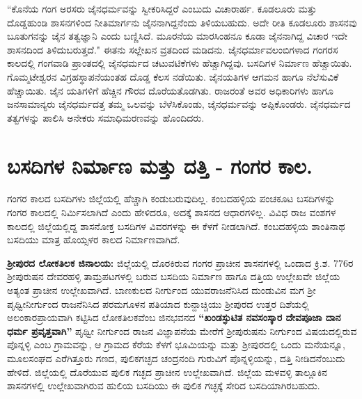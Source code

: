 “ಕೊನೆಯ ಗಂಗ ಅರಸರು ಜೈನಧರ್ಮವನ್ನು ಸ್ವೀಕರಿಸಿದ್ದರೆ ಎಂಬುದು ವಿಚಾರಾರ್ಹ. ಕೂಡಲೂರು ಮತ್ತು ದೊಡ್ಡಹುಂಡಿ ಶಾಸನಗಳಿಂದ ನೀತಿಮಾರ್ಗನು ಜೈನನಾಗಿದ್ದನೆಂದು ತಿಳಿಯಬಹುದು. ಅದೇ ರೀತಿ ಕೂಡಲೂರು ಶಾಸನವು ಬೂತುಗನನ್ನು ಜೈನ ತತ್ವಜ್ಞಾನಿ ಎಂದು ಬಣ್ಣಿಸಿದೆ. ಮೂರನೆಯ ಮಾರಸಿಂಹನೂ ಕೂಡಾ ಜೈನನಾಗಿದ್ದ ವಿಚಾರ ಇದೇ ಶಾಸನದಿಂದ ತಿಳಿದುಬರುತ್ತದೆ." ಈತನು ಸಲ್ಲೇಖನ ವ್ರತದಿಂದ ಮಡಿದನು. ಜೈನಧರ್ಮಾವಲಂಬಿಗಳಾದ ಗಂಗರಸ ಕಾಲದಲ್ಲಿ ಗಂಗವಾಡಿ ಪ್ರಾಂತದಲ್ಲಿ ಜೈನಧರ್ಮದ ಚಟುವಟಿಕೆಗಳು ಹೆಚ್ಚಾಗಿದ್ದವು. ಬಸದಿಗಳ ನಿರ್ಮಾಣ ಹೆಚ್ಚಾಯಿತು. ಗೊಮ್ಮಟೇಶ್ವರನ ವಿಗ್ರಹಸ್ಥಾಪನೆಯಂತಹ ದೊಡ್ಡ ಕೆಲಸ ನಡೆಯಿತು. ಜೈನಯತಿಗಳ ಆಗಮನ ಹಾಗೂ ನೆಲೆಸುವಿಕೆ ಹೆಚ್ಚಾಯಿತು. ಜೈನ ಯತಿಗಳಿಗೆ ಹೆಚ್ಚಿನ ಗೌರವ ದೊರೆಯತೊಡಗಿತು. ರಾಜರಂತೆ ಅವರ ಅಧಿಕಾರಿಗಳು ಹಾಗೂ ಜನಸಾಮಾನ್ಯರು ಜೈನಧರ್ಮದತ್ತ ತಮ್ಮ ಒಲವನ್ನು ಬೆಳೆಸಿಕೊಂಡು, ಜೈನಧರ್ಮವನ್ನು ಅಪ್ಪಿಕೊಂಡರು. ಜೈನಧರ್ಮದ ತತ್ವಗಳನ್ನು ಪಾಲಿಸಿ ಅನೇಕರು ಸಮಾಧಿಮರಣವನ್ನು ಹೊಂದಿದರು.


\section*{ಬಸದಿಗಳ ನಿರ್ಮಾಣ ಮತ್ತು ದತ್ತಿ - ಗಂಗರ ಕಾಲ.}

ಗಂಗರ ಕಾಲದ ಬಸದಿಗಳು ಜಿಲ್ಲೆಯಲ್ಲಿ ಹೆಚ್ಚಾಗಿ ಕಂಡುಬರುವುದಿಲ್ಲ. ಕಂಬದಹಳ್ಳಿಯ ಪಂಚಕೂಟ ಬಸದಿಗಳನ್ನು ಗಂಗರ ಕಾಲದಲ್ಲಿ ನಿರ್ಮಿಸಲಾಗಿದೆ ಎಂದು ಹೇಳಿದರೂ, ಅದಕ್ಕೆ ಶಾಸನದ ಆಧಾರಗಳಿಲ್ಲ. ವಿವಿಧ ರಾಜ ವಂಶಗಳ ಕಾಲದಲ್ಲಿ ಜಿಲ್ಲೆಯಲ್ಲಿದ್ದ ಶಾಸನೋಕ್ತ ಬಸದಿಗಳ ವಿವರಗಳನ್ನು ಈ ಕೆಳಗೆ ನೀಡಲಾಗಿದೆ. ಕಂಬದಹಳ್ಳಿಯ ಶಾಂತಿನಾಥ ಬಸದಿಯು ಮಾತ್ರ ಹೊಯ್ಸಳರ ಕಾಲದ ನಿರ್ಮಾಣವಾಗಿದೆ.

\textbf{ಶ‍್ರೀಪುರದ ಲೋಕತಿಲಕ ಜಿನಾಲಯ:} ಜಿಲ್ಲೆಯಲ್ಲಿ ದೊರಕಿರುವ ಗಂಗರ ಪ್ರಾಚೀನ ಶಾಸನಗಳಲ್ಲಿ ಒಂದಾದ ಕ್ರಿ.ಶ. 776ರ ಶ‍್ರೀಪುರುಷನ ದೇವರಹಳ್ಳಿ ತಾಮ್ರಪಟಗಳಲ್ಲಿ ಬರುವ ಬಸದಿಯ ನಿರ್ಮಾಣ ಹಾಗೂ ದತ್ತಿಯ ಉಲ್ಲೇಖವೇ ಜಿಲ್ಲೆಯ ಅತ್ಯಂತ ಪ್ರಾಚೀನ ಉಲ್ಲೇಖವಾಗಿದೆ. ಬಾಣಕುಲದ ನೀರ್ಗುಂದ ಯುವರಾಜನೆನಿಸಿದ ದುಂಡುವಿನ ಮಗ ಶ‍್ರೀ ಪೃಥ್ವೀನೀರ್ಗುಂದ ರಾಜನೆನಿಸಿದ ಪರಮಗೂಳನ ಪತಿಯಾದ ಕುನ್ದಾಚ್ಚಿಯು ಶ‍್ರೀಪುರದ ಉತ್ತರ ದಿಶೆಯಲ್ಲಿ ಅಲಂಕಾರಪ್ರಾಯವಾಗಿ ಕಟ್ಟಿಸಿದ ಲೋಕತಿಲಕವೆಂಬ ಜಿನಭವನದ \textbf{“ಖಂಡಸ್ಫುಟಿತ ನವಸಂಸ್ಕಾರ ದೇವಪೂಜಾ ದಾನ ಧರ್ಮ ಪ್ರವೃತ್ತವಾಗಿ”} ಪೃಥ್ವೀ ನೀರ್ಗುಂದ ರಾಜನ ವಿಜ್ಞಾಪನೆಯ ಮೇರೆಗೆ ಶ‍್ರೀಪುರುಷನು ನೀರ್ಗುಂದ ವಿಷಯದಲ್ಲಿರುವ ಪೊನ್ನಳ್ಳಿ ಎಂಬ ಗ್ರಾಮವನ್ನು, ಆ ಗ್ರಾಮದ ಕೆರೆಯ ಕೆಳಗೆ ಭೂಮಿಯನ್ನು ಮತ್ತು ಶ‍್ರೀಪುರದಲ್ಲಿ ಒಂದು ಮನೆಯನ್ನೂ, ಮೂಲಸಂಘದ ಎರೆಗಿತ್ತೂರು ಗಣದ, ಪುಲಿಕಗಚ್ಛದ ಚಂದ್ರನಂದಿ ಗುರುವಿಗೆ ಪೊನ್ನಳ್ಳಿಯನ್ನು, ದತ್ತಿ ನೀಡಿದನೆಂಬುದು ಹೇಳಿದೆ. ಜಿಲ್ಲೆಯಲ್ಲಿ ದೊರೆಯುವ ಪುಲಿಕ ಗಚ್ಛದ ಪ್ರಾಚೀನ ಉಲ್ಲೇಖವಾಗಿದೆ.  ಜಿಲ್ಲೆಯ ಮಳವಳ್ಳಿ ತಾಲ್ಲೂಕಿನ ಶಾಸನಗಳಲ್ಲಿ ಉಲ್ಲೇಖವಾಗಿರುವ ಹುಲಿಯ ಬಸದಿಯು ಈ ಪುಲಿಕ ಗಚ್ಛಕ್ಕೆ ಸೇರಿದ ಬಸದಿಯಾಗಿರಬಹುದು.

